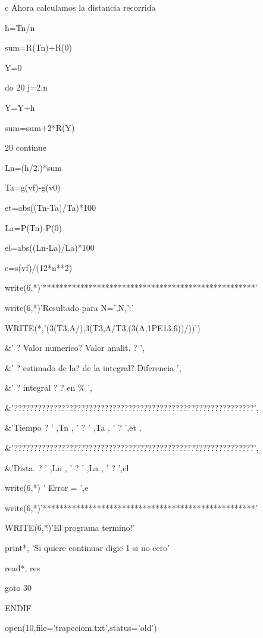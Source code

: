 c     Ahora calculamos la distancia recorrida



      h=Tn/n

      sum=R(Tn)+R(0)

      Y=0

      do 20 j=2,n

      Y=Y+h

      sum=sum+2*R(Y)

20    continue

      Ln=(h/2.)*sum

      Ta=g(vf)-g(v0)

      et=abs((Tn-Ta)/Ta)*100

      La=P(Tn)-P(0)

      el=abs((Ln-La)/La)*100

      e=s(vf)/(12*n**2)

      write(6,*)'***************************************************'

      write(6,*)'Resultado para N=',N,':'

      WRITE(*,'(3(T3,A/),3(T3,A/T3,(3(A,1PE13.6))/))')

     \&'              ? Valor numerico? Valor analit. ?      
        ',

     \&'              ? estimado de la? de la integral?   Diferencia 
',

     \&'              ? integral      ?               ?   en 
\%       ',

     \&'?????????????????????????????????????????????????????????????',

     \&'Tiempo        ? ' ,Tn    ,  ' ? ' ,Ta    ,  ' ? ',et 
         ,

     \&'?????????????????????????????????????????????????????????????',

     \&'Dista.        ? ' ,Ln    ,  ' ? ' ,La    ,  ' ? ',el

      write(6,*) ' Error = ',e

      write(6,*)'***************************************************'

      WRITE(6,*)'El programa termino!'

       print*, 'Si quiere continuar digie 1 si no cero'

       read*,  res

       goto 30

      ENDIF

      open(10,file='trapeciom.txt',status='old')

